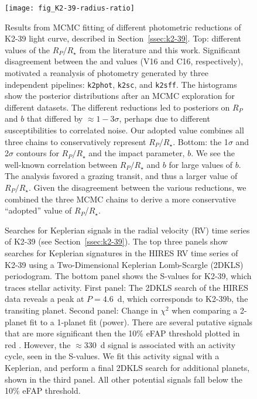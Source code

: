 \documentclass[preprint2]{aastex6}
\newcommand{\Rstar}{\ensuremath{R_{\star}}\xspace}
\newcommand{\Rp}{\ensuremath{R_P}\xspace}
\newcommand{\rrat}{\ensuremath{\Rp/\Rstar}\xspace}
\begin{document}
\begin{figure}
\texttt{[image: fig\_K2-39-radius-ratio]}
\caption{Results from MCMC fitting of different photometric reductions of K2-39 light curve, described in Section~\ref{ssec:k2-39}. Top: different values of the \rrat from the literature and this work. Significant disagreement between the \cite{VanEylen16b} and \cite{Crossfield16} values (V16 and C16, respectively), motivated a reanalysis of photometry generated by three independent pipelines: {\tt k2phot}, {\tt k2sc}, and {\tt k2sff}. The histograms show the posterior distributions after an MCMC exploration for different datasets. The different reductions led to posteriors on \Rp and $b$ that differed by $\approx1-3\sigma$, perhaps due to different susceptibilities to correlated noise. Our adopted value combines all three chains to conservatively represent \rrat. Bottom: the 1$\sigma$ and 2$\sigma$ contours for \rrat and the impact parameter, $b$. We see the well-known correlation between \rrat and $b$ for large values of $b$. The \cite{Crossfield16} analysis favored a grazing transit, and thus a larger value of $\rrat$. Given the disagreement between the various reductions, we combined the three MCMC chains to derive a more conservative ``adopted'' value of \Rp/\Rstar.  \label{fig:k2-39-radius}}
\end{figure}


\begin{figure}
\caption{Searches for Keplerian signals in the radial velocity (RV) time series of K2-39 (see Section~\ref{ssec:k2-39}). The top three panels show searches for Keplerian signatures in the HIRES RV time series of K2-39 using a Two-Dimensional Keplerian Lomb-Scargle (2DKLS) periodogram. The bottom panel shows the S-values for K2-39, which traces stellar activity. First panel: The 2DKLS search of the HIRES data reveals a peak at $P = 4.6$~d, which corresponds to K2-39b, the transiting planet. Second panel: Change in $\chi^2$ when comparing a 2-planet fit to a 1-planet fit (power). There are several putative signals that are more significant then the 10\% eFAP threshold plotted in red \citep{Howard16}. However, the $\approx$330~d signal is associated with an activity cycle, seen in the S-values. We fit this activity signal with a Keplerian, and perform a final 2DKLS search for additional planets, shown in the third panel. All other potential signals fall below the 10\% eFAP threshold.}
\label{fig:k2-39-pgram}
\end{figure}
\end{document}
